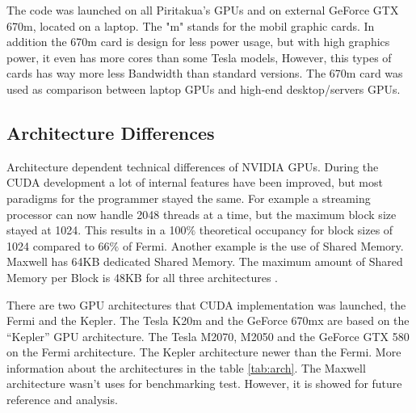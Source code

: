  The code was launched on all Piritakua's GPUs and on external GeForce GTX 670m, located on a laptop. The "m" stands for the mobil graphic cards. In addition the 670m card is design for less power usage, but with high graphics power, it even has more cores than some Tesla models, However, this types of cards has way more less Bandwidth than standard versions. The 670m card was used as comparison between laptop GPUs and high-end desktop/servers GPUs.
     
\subsection{Architecture Differences}

  Architecture dependent technical differences of NVIDIA GPUs. During the CUDA development a lot of internal features have been improved, but most paradigms for the programmer stayed the same. For example a streaming processor can now handle 2048 threads at a time, but the maximum block size stayed at 1024. This results in a 100$\%$ theoretical occupancy for block sizes of 1024 compared to 66$\%$ of Fermi. Another example is the use of Shared Memory. Maxwell has 64KB dedicated Shared Memory. The maximum amount of Shared Memory per Block is 48KB for all three architectures \cite{hoermanngpu}.
  
  There are two GPU architectures that CUDA implementation was launched, the Fermi and the Kepler. The Tesla K20m and the GeForce 670mx are based on the ``Kepler'' GPU architecture. The Tesla M2070, M2050 and the GeForce GTX 580 on the Fermi architecture. The Kepler architecture newer than the Fermi. More information about the architectures in the table \ref{tab:arch}. The Maxwell architecture wasn't uses for benchmarking test. However, it is showed for future reference and analysis.
  
